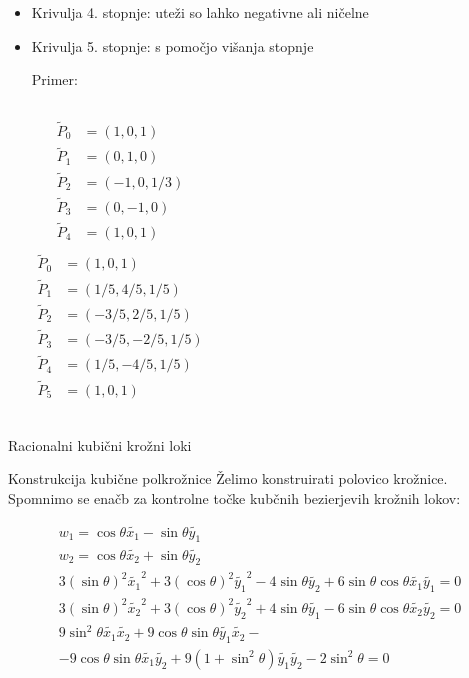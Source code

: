 \documentclass[t]{beamer}
\begin{document}
\begin{frame}
\begin{itemize}
\item Krivulja 4. stopnje: uteži so lahko negativne ali ničelne
\item Krivulja 5. stopnje: s pomočjo višanja stopnje

Primer:
\begin{columns}
	\begin{align*}
	\tilde{P}_0 &= (1,0, 1)\\
	\tilde{P}_1 &= (0, 1, 0)\\
	\tilde{P}_2 &= (-1, 0, 1/3)\\
	\tilde{P}_3 &= (0, -1, 0)\\
	\tilde{P}_4 &= (1, 0, 1) \\
	\end{align*}
    \begin{align*}
	\tilde{P}_0 &= (1,0, 1)\\
	\tilde{P}_1 &= (1/5, 4/5, 1/5)\\
	\tilde{P}_2 &= (-3/5, 2/5, 1/5)\\
	\tilde{P}_3 &= (-3/5, -2/5, 1/5)\\
	\tilde{P}_4 &= (1/5, -4/5, 1/5)\\
	\tilde{P}_5 &= (1, 0, 1) \\
	\end{align*}
\end{columns}

\end{itemize}
\end{frame}

\begin{frame}{Racionalni kubični krožni loki}
\end{frame}

\begin{frame}{Konstrukcija kubične polkrožnice}
Želimo konstruirati polovico krožnice. Spomnimo se enačb za kontrolne točke kubčnih bezierjevih krožnih lokov:

\begin{align*}
w_{1} = \cos \theta \tilde{x_{1}} - \sin \theta  \tilde{y_{1}} \\
w_{2} = \cos \theta  \tilde{x_{2}} + \sin \theta  \tilde{y_{2}} \\
3(\sin \theta )^{2} \tilde{x_{1}}^2 + 3(\cos \theta )^{2} \tilde{y_{1}}^2 - 4 \sin \theta \tilde{y_{2}} + 6\sin \theta \cos \theta \tilde{x_{1}}\tilde{y_{1}} = 0 \\
3(\sin \theta )^{2} \tilde{x_{2}}^2 + 3(\cos \theta )^{2} \tilde{y_{2}}^2 + 4 \sin \theta \tilde{y_{1}} - 6\sin \theta \cos \theta \tilde{x_{2}}\tilde{y_{2}} = 0 \\
9\sin^{2}\theta \tilde{x_{1}}\tilde{x_{2}} + 9 \cos \theta \sin \theta \tilde{y_{1}}\tilde{x_{2}} -\\ -9\cos \theta \sin \theta \tilde{x_{1}} \tilde{y_{2}} + 9 (1 + \sin^2 \theta) \tilde{y_{1}} \tilde{y_{2}} - 2\sin^2\theta = 0
\end{align*}
\end{frame}
\end{document}

